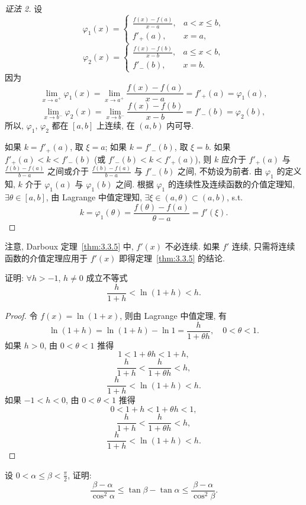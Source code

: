\begin{proof}[证法 2]
设
\[
\varphi_1(x)=\begin{cases}\frac{f(x)-f(a)}{x-a},&a<x\leqslant b,\\ f'_+(a),&x=a,\end{cases}
\]
\[
\varphi_2(x)=\begin{cases}\frac{f(x)-f(b)}{x-b},&a\leqslant x<b,\\ f'_-(b),&x=b.\end{cases}
\]
因为
\[
\lim_{x\to a^+}\varphi_1(x)=\lim_{x\to a^+}\frac{f(x)-f(a)}{x-a}=f'_+(a)=\varphi_1(a),
\]
\[
\lim_{x\to b^-}\varphi_2(x)=\lim_{x\to b^-}\frac{f(x)-f(b)}{x-b}=f'_-(b)=\varphi_2(b),
\]
所以, $\varphi_1$, $\varphi_2$ 都在 $[a,b]$ 上连续, 在 $(a,b)$ 内可导.

如果 $k=f'_+(a)$, 取 $\xi=a$; 如果 $k=f'_-(b)$, 取 $\xi=b$. 如果 $f'_+(a)<k<f'_-(b)$ (或 $f'_-(b)<k<f'_+(a)$), 则 $k$ 应介于 $f'_+(a)$ 与 $\frac{f(b)-f(a)}{b-a}$ 之间或介于 $\frac{f(b)-f(a)}{b-a}$ 与 $f'_-(b)$ 之间, 不妨设为前者. 由 $\varphi_1$ 的定义知, $k$ 介于 $\varphi_1(a)$ 与 $\varphi_1(b)$ 之间. 根据 $\varphi_1$ 的连续性及连续函数的介值定理知, $\exists\theta\in[a,b]$, 由 Lagrange 中值定理知, $\exists\xi\in(a,\theta)\subset(a,b)$, s.t.
\[
k=\varphi_1(\theta)=\frac{f(\theta)-f(a)}{\theta-a}=f'(\xi).
\]
\end{proof}

\begin{remark}\label{rem:3.3.2}
注意, Darboux 定理~\ref{thm:3.3.5} 中, $f'(x)$ 不必连续. 如果 $f'$ 连续, 只需将连续函数的介值定理应用于 $f'(x)$ 即得定理~\ref{thm:3.3.5} 的结论.
\end{remark}

\begin{example}\label{ex:3.3.2}
证明: $\forall h>-1$, $h\neq0$ 成立不等式
\[
\frac{h}{1+h}<\ln(1+h)<h.
\]
\end{example}

\begin{proof}
令 $f(x)=\ln(1+x)$, 则由 Lagrange 中值定理, 有
\[
\ln(1+h)=\ln(1+h)-\ln1=\frac{h}{1+\theta h},\quad0<\theta<1.
\]
如果 $h>0$, 由 $0<\theta<1$ 推得
\[
1<1+\theta h<1+h,
\]
\[
\frac{h}{1+h}<\frac{h}{1+\theta h}<h,
\]
\[
\frac{h}{1+h}<\ln(1+h)<h.
\]
如果 $-1<h<0$, 由 $0<\theta<1$ 推得
\[
0<1+h<1+\theta h<1,
\]
\[
\frac{h}{1+h}<\frac{h}{1+\theta h}<h,
\]
\[
\frac{h}{1+h}<\ln(1+h)<h.
\]
\end{proof}

\begin{example}\label{ex:3.3.3}
设 $0<\alpha\leqslant\beta<\frac{\pi}{2}$, 证明:
\[
\frac{\beta-\alpha}{\cos^{2}\alpha}\leqslant\tan\beta-\tan\alpha\leqslant\frac{\beta-\alpha}{\cos^{2}\beta}.
\]
\end{example}

